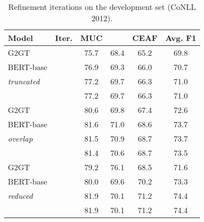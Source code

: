 \documentclass[11pt]{article}
\begin{document}
\begin{table}[t]
	\centering
	\begin{adjustbox}{width=1\linewidth}
		\begin{tabular}{l l c c c c } 
			\toprule 
			\textbf{Model} & \textbf{Iter.} & \textbf{MUC} & \textbf{} & \textbf{CEAF} & \textbf{Avg. F1}\\ \hline
			G2GT  &  & 75.7 & 68.4 & 65.2 & 69.8 \\
			BERT-base &  & 76.9 & 69.3 & 66.0 & 70.7 \\
			\emph{truncated}&  & 77.2 & 69.7 & 66.3 & 71.0 \\
			&  & 77.2 & 69.7 & 66.3 & 71.0 \\ \hline
			G2GT   &  & 80.6 & 69.8 & 67.4 & 72.6 \\ 
			BERT-base &  & 81.6	& 71.0 & 68.6 &  73.7 \\
			\emph{overlap}&  & 81.5 & 70.9 & 68.7 & 73.7 \\
			&  & 81.4 & 70.6 & 68.7 & 73.5 \\\hline
			G2GT   &  & 79.2 & 76.1 & 68.5 & 71.6  \\
			BERT-base&  & 80.0 & 69.6 & 70.2 & 73.3  \\
			\emph{reduced}&  & 81.9 & 70.1 & 71.2 & 74.4 \\
			&  & 81.9 & 70.1 & 71.2 & 74.4  \\
			\bottomrule 
		\end{tabular} 
	\end{adjustbox}  
	\caption{Refinement iterations  on the development set (CoNLL 2012).}
	\label{tab:coreference:iter}
	
\end{table}
\end{document}
